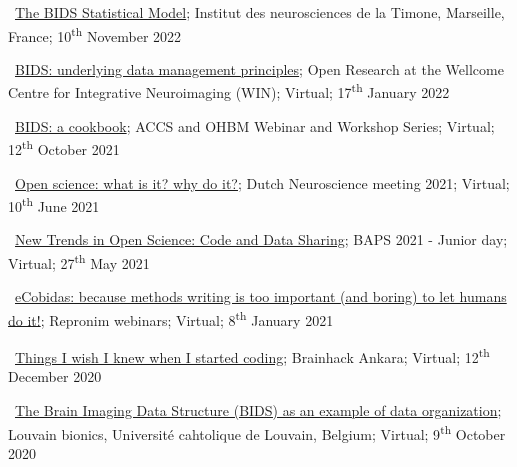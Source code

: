 \textbullet~\href{https://osf.io/jpfrh}
{The BIDS Statistical Model};
Institut des neurosciences de la Timone, Marseille, France;
10\textsuperscript{th} November 2022

\textbullet~\href{https://osf.io/h6gsr/}{BIDS: underlying data management principles};
Open Research at the Wellcome Centre for Integrative Neuroimaging (WIN);
Virtual;
17\textsuperscript{th} January 2022

\textbullet~\href{https://remi-gau.github.io/bids_cookbook/}{BIDS: a cookbook};
ACCS and OHBM Webinar and Workshop Series;
Virtual;
12\textsuperscript{th} October 2021

\textbullet~\href{https://osf.io/ce7tn/}{Open science: what is it? why do it?};
Dutch Neuroscience meeting 2021;
Virtual;
10\textsuperscript{th} June 2021

\textbullet~\href{https://osf.io/6kzn2/}{New Trends in Open Science: Code and Data Sharing};
BAPS 2021 - Junior day;
Virtual;
27\textsuperscript{th} May 2021

\textbullet~\href{https://osf.io/fb7tx/}{eCobidas: because methods writing is too important (and boring) to let humans do it!};
Repronim webinars;
Virtual;
8\textsuperscript{th} January 2021

\textbullet~\href{https://osf.io/vdgua/}{Things I wish I knew when I started coding};
Brainhack Ankara;
Virtual;
12\textsuperscript{th} December 2020

\textbullet~\href{https://osf.io/zf5x8/}{The Brain Imaging Data Structure (BIDS) as an example of data organization};
Louvain bionics, Université cahtolique de Louvain, Belgium;
Virtual;
9\textsuperscript{th} October 2020
